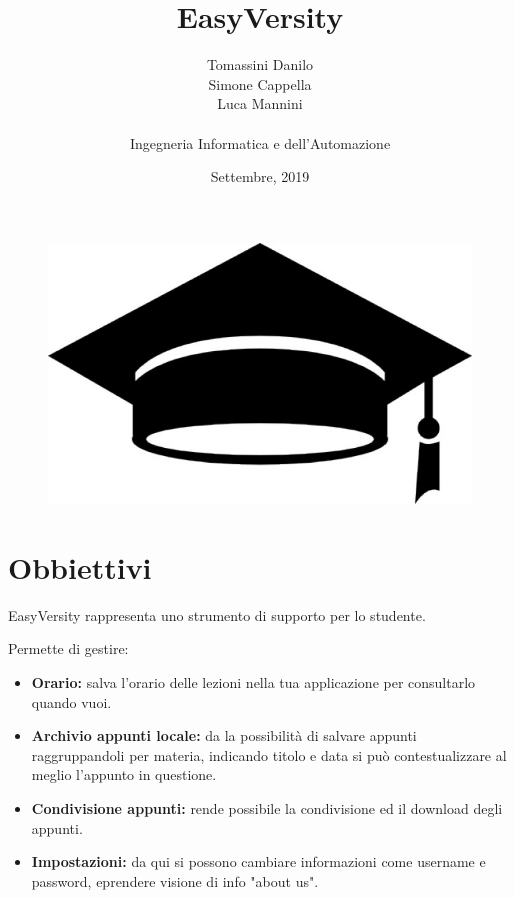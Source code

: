 \documentclass[a4paper, 50pt, twoside]{article}
\begin{document}
\title{EasyVersity}
\date{Settembre, 2019}
\author{Tomassini Danilo \\ Simone Cappella \\ Luca Mannini \\ \\ Ingegneria Informatica e dell'Automazione}
\maketitle
\vspace*{\fill}
\begin{figure}[h!]
	\centering
	\includegraphics[width=\linewidth]{copertina4.jpg}
	\label {fig::copertina}
\end{figure}
\vspace*{\fill}

\newpage
\tableofcontents{}

\newpage
\section{Obbiettivi}
EasyVersity rappresenta uno strumento di supporto per lo studente.

Permette di gestire:
\begin{itemize}
\item \textbf{Orario:} salva l'orario delle lezioni nella tua applicazione per consultarlo quando vuoi.
\item \textbf{Archivio appunti locale:} da la possibilità di salvare appunti raggruppandoli per materia, indicando titolo e data si può contestualizzare al meglio l'appunto in questione.
\item \textbf{Condivisione appunti:} rende possibile la condivisione ed il download degli appunti.
\item \textbf{Impostazioni:} da qui si possono cambiare informazioni come username e password, eprendere visione di info "about us".
\end{itemize}
\end{document}
